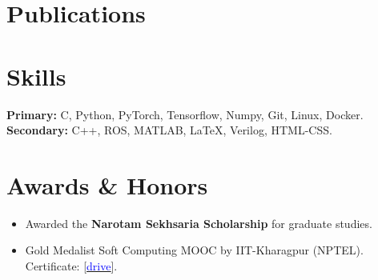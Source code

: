 \documentclass[10pt,letter,sans]{moderncv}        %
\begin{document}
\vspace{-0.7em}
\section{Publications}

\vspace{-1.5em}
\section{Skills}
\vspace{-0.5em}
\textbf{\large Primary:} C, Python, PyTorch, Tensorflow, Numpy, Git, Linux, Docker. \\
\textbf{\large Secondary:} C++, ROS, MATLAB, LaTeX, Verilog, HTML-CSS.

\vspace{-1.0em}
\section{Awards \& Honors}
\vspace{-0.5em}
\begin{itemize}
    \item[\textbullet] Awarded the \textbf{Narotam Sekhsaria Scholarship} for graduate studies.
    \item[\textbullet] Gold Medalist Soft Computing MOOC by IIT-Kharagpur (NPTEL). Certificate: [\href{https://drive.google.com/file/d/1dKUy8gFmk8qgwBTK5Nt_A5F2VZkxPQ9Y/view?usp=sharing}{\underline{\textcolor{blue}{drive}}}].
\end{itemize}


  
\end{document}
